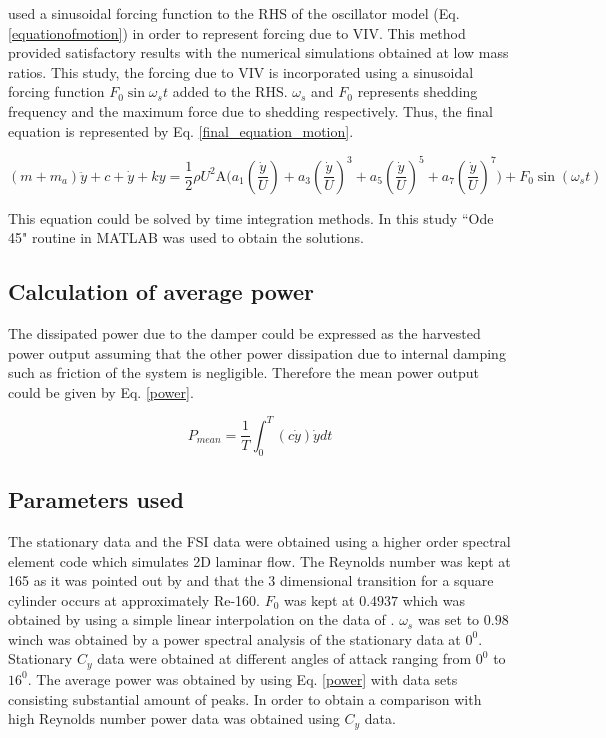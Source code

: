 
\cite{Joly2012} used a sinusoidal forcing function to the RHS of the oscillator model (Eq. \eqref{equationofmotion}) in order to represent forcing due to VIV. This method provided satisfactory results with the numerical simulations obtained at low mass ratios. This study, the forcing due to VIV is incorporated using a sinusoidal forcing function $F_0\sin{\omega_{s}t}$ added to the RHS. $\omega_{s}$ and $F_0$ represents shedding frequency and the maximum force due to shedding respectively. Thus, the final equation is represented by Eq. \eqref{final_equation_motion}.    

\begin{equation}
\label{final_equation_motion}
(m{+}m_a)\ddot{y}{+}c{+}\dot{y}{+}ky{=}\frac{1}{2}\rho U^2 \text{A} \Bigg(a_1\left(\frac{\dot{y}}{U}\right){+}a_3\left(\frac{\dot{y}}{U}\right)^3{+}a_5\left(\frac{\dot{y}}{U}\right)^5{+}a_7\left(\frac{\dot{y}}{U}\right)^7 \Bigg){+} F_0\sin{(\omega_s t)}
\end{equation}

This equation could be solved by time integration methods. In  this study  ``Ode 45" routine in MATLAB was used to obtain the solutions.

\subsection{Calculation of average power}

 The dissipated power due to the damper could be expressed as the harvested power output assuming that the other  power dissipation due to internal damping such as friction of the system is negligible. Therefore the mean power output could be given by Eq. \eqref{power}. 
  
 
 \begin{equation}
 \label{power}
P_{mean}=\frac{1}{T}\int_{0}^{T}(c\dot{y})\dot{y} dt
 \end{equation}
 
\subsection{Parameters used} 
 
The stationary data and the FSI data were obtained using a higher order spectral element code which simulates 2D laminar flow. The Reynolds number was kept at 165 as it was pointed out by \cite{Sheard2009} and \cite{Tong2008} that the 3 dimensional transition for a square cylinder occurs at approximately Re-160. $F_0$ was kept at $0.4937$ which was obtained by using a simple linear interpolation on the data of \cite{Joly2012}. $\omega_s$ was set to $0.98$ winch was obtained by a power spectral analysis of the stationary data at $0^0$. Stationary $C_y$ data were obtained at different angles of attack ranging from $0^0$ to $16^0$. The average power was obtained by using Eq. \eqref{power} with data sets consisting substantial amount of peaks. In order to obtain a comparison with high Reynolds number power data was obtained using \cite{Parkinson1964} $C_y$ data.


